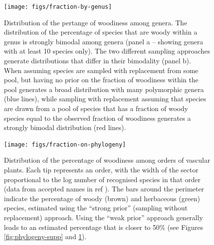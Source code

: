 \documentclass[12pt]{article}
\begin{document}
\begin{figure}[p]
  \centering
  \texttt{[image: figs/fraction-by-genus]}
  \caption{Distribution of the pertange of woodiness among genera.
    The distribution of the percentage of species that are woody within
    a genus is strongly bimodal among genera (panel a -- showing
    genera with at least 10 species only).
    The two different sampling approaches generate distributions that
    differ in their bimodality (panel b). When assuming species are
    sampled with replacement from some pool, but having no prior on
    the fraction of woodiness within the pool generates a broad
    distribution with many polymorphic genera (blue lines), while
    sampling with replacement assuming that species are drawn from a
    pool of species that has a fraction of woody species equal to the
    observed fraction of woodiness generates a strongly bimodal
    distribution (red lines).}
  \label{fig:distribution-genera}
\end{figure}

\begin{figure}[p]
  \centering
  \texttt{[image: figs/fraction-on-phylogeny]}
  \caption{Distribution of the percentage of woodiness among orders of
    vascular plants.  Each tip represents an order, with the width of
    the sector proportional to the log number of recognised species in
    that order (data from accepted names in ref \citep{ThePlantList}).
    The bars around the perimeter indicate the percentage of woody
    (brown) and herbaceous (green) species, estimated using the
    ``strong prior'' (sampling without replacement) approach.  Using
    the ``weak prior'' approach generally leads to an estimated
    percentage that is closer to 50\% (see Figures
    \ref{fig:phylogeny-supp} and \ref{fig:distribution-genera}).}
\label{fig:phylogeny}
\end{figure}

\clearpage
\renewcommand\thefigure{S.\arabic{figure}}
\setcounter{figure}{0}    
\end{document}
